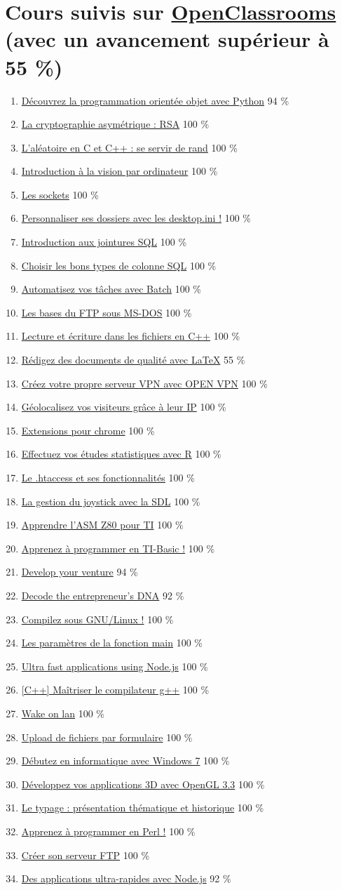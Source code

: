 \documentclass{article}
\newcommand{\lesson}[3]
{
	\item \href{https://openclassrooms.com/courses/#1}{#2} #3 \%
}
\begin{document}

	\section{Cours suivis sur \href{https://openclassrooms.com/fr/membres/benjaminloison}{OpenClassrooms} (avec un avancement supérieur à 55 \%)}

	\begin{enumerate}

		\lesson{4302126}{Découvrez la programmation orientée objet avec Python}{94}
		\lesson{1362801}{La cryptographie asymétrique : RSA}{100}
		\lesson{1067141}{L'aléatoire en C et C++ : se servir de rand}{100}
		\lesson{1490316}{Introduction à la vision par ordinateur}{100}
		\lesson{1160706}{Les sockets}{100}
		\lesson{1104776}{Personnaliser ses dossiers avec les desktop.ini !}{100}
		\lesson{1208071}{Introduction aux jointures SQL}{100}
		\lesson{1225826}{Choisir les bons types de colonne SQL}{100}
		\lesson{1945566}{Automatisez vos tâches avec Batch}{100}
		\lesson{1063476}{Les bases du FTP sous MS-DOS}{100}
		\lesson{1133001}{Lecture et écriture dans les fichiers en C++}{100}
		\lesson{1617396}{Rédigez des documents de qualité avec LaTeX}{55}
		\lesson{2460986}{Créez votre propre serveur VPN avec OPEN VPN}{100}
		\lesson{1229396}{Géolocalisez vos visiteurs grâce à leur IP}{100}
		\lesson{1408416}{Extensions pour chrome}{100}
		\lesson{1393696}{Effectuez vos études statistiques avec R}{100}
		\lesson{1093276}{Le .htaccess et ses fonctionnalités}{100}
		\lesson{373115}{La gestion du joystick avec la SDL}{100}
		\lesson{533864}{Apprendre l'ASM Z80 pour TI}{100}
		\lesson{960281}{Apprenez à programmer en TI-Basic !}{100}
		\lesson{2976551}{Develop your venture}{94}
		\lesson{2709621}{Decode the entrepreneur's DNA}{92}
		\lesson{1130196}{Compilez sous GNU/Linux !}{100}
		\lesson{1090881}{Les paramètres de la fonction main}{100}
		\lesson{2504541}{Ultra fast applications using Node.js}{100}
		\lesson{1262861}{[C++] Maîtriser le compilateur g++}{100}
		\lesson{1159951}{Wake on lan}{100}
		\lesson{1085676}{Upload de fichiers par formulaire}{100}
		\lesson{709545}{Débutez en informatique avec Windows 7}{100}
		\lesson{966823}{Développez vos applications 3D avec OpenGL 3.3}{100}
		\lesson{1129721}{Le typage : présentation thématique et historique}{100}
		\lesson{1601801}{Apprenez à programmer en Perl !}{100}
		\lesson{1256396}{Créer son serveur FTP}{100}
		\lesson{1056721}{Des applications ultra-rapides avec Node.js}{92}

\end{enumerate}
\end{document}
